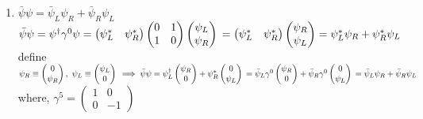 \documentclass[12pt]{amsart}
\begin{document}
\begin{enumerate}
\item \underline{$ \bar{\psi} \psi = \bar{\psi}_L \psi_R + \bar{\psi}_R \psi_L$}\\
$\bar{\psi} \psi = \psi^{\dagger} \gamma^0 \psi = \begin{pmatrix} \psi_L^* & \psi_R^* \end{pmatrix} \begin{pmatrix} 0 & 1 \\ 1 & 0 \end{pmatrix} \begin{pmatrix} \psi_L \\ \psi_R \end{pmatrix}\\
= \begin{pmatrix} \psi_L^* & \psi_R^* \end{pmatrix} \begin{pmatrix} \psi_R \\ \psi_L \end{pmatrix} = \psi_L^* \psi_R + \psi_R^* \psi_L\\$
define $\psi_R \equiv \begin{pmatrix} 0 \\ \psi_R \end{pmatrix},\,\, \psi_L \equiv \begin{pmatrix} \psi_L \\ 0 \end{pmatrix}\\
\implies \bar{\psi} \psi = \psi_L^{\dagger} \begin{pmatrix} \psi_R \\ 0 \end{pmatrix} + \psi_R^* \begin{pmatrix} 0 \\ \psi_L \end{pmatrix}\\
= \bar{\psi}_L \gamma^0 \begin{pmatrix} \psi_R \\ 0 \end{pmatrix} + \bar{\psi}_R \gamma^0 \begin{pmatrix} 0 \\ \psi_L \end{pmatrix}\\
= \bar{\psi}_L \psi_R + \bar{\psi}_R \psi_L\\$
where, $\gamma^5 = \begin{pmatrix} 1 & 0 \\ 0 & -1 \end{pmatrix}$\\



\end{enumerate}
\end{document}
